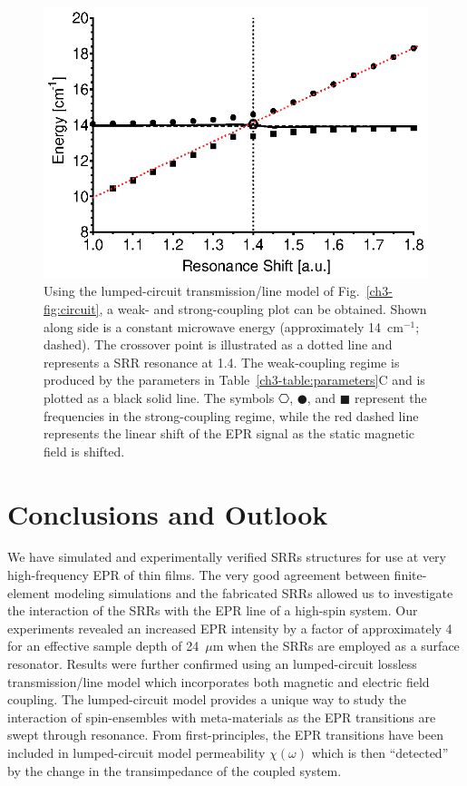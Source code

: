 \begin{figure}[htp]\centering
  \includegraphics{Kapitel/Ch3-Images/08-RadiationDampening.eps}%
  \caption[Calculated weak- and strong-coupling regime using the analytical model.]{Using the lumped-circuit transmission\-/line model of Fig.~\ref{ch3-fig:circuit}, a weak- and strong-coupling plot can be obtained. Shown along side is a constant microwave energy (approximately 14~cm$^{-1}$; dashed). The crossover point is illustrated as a dotted line and represents a SRR resonance at 1.4. The weak-coupling regime is produced by the parameters in Table~\ref{ch3-table:parameters}C and is plotted as a black solid line. The symbols $\hexagon$, $\CIRCLE$, and $\blacksquare$ represent the frequencies in the strong-coupling regime, while the red dashed line represents the linear shift of the EPR signal as the static magnetic field is shifted.}\label{ch3-fig:strong-weak}
\end{figure}

\section{Conclusions and Outlook}
We have simulated and experimentally verified SRRs structures for use at very high-frequency EPR of thin films. The very good agreement between finite-element modeling simulations and the fabricated SRRs allowed us to investigate the interaction of the SRRs with the EPR line of a high-spin system. Our experiments revealed an increased EPR intensity by a factor of approximately 4 for an effective sample depth of 24~$\mu$m when the SRRs are employed as a surface resonator. Results were further confirmed using an lumped-circuit lossless transmission\-/line model which incorporates both magnetic and electric field coupling. The lumped-circuit model provides a unique way to study the interaction of spin-ensembles with meta-materials as the EPR transitions are swept through resonance. From first-principles, the EPR transitions have been included in lumped-circuit model permeability $\chi(\omega)$ which is then ``detected'' by the change in the transimpedance of the coupled system.

